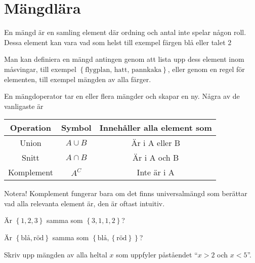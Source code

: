 \section{Mängdlära}

\begin{definition}[Mängd]
En mängd är en samling element där ordning och antal inte spelar någon roll. Dessa element kan vara vad som helst till exempel färgen blå eller talet 2
\end{definition}

Man kan definiera en mängd antingen genom att lista upp dess element inom måsvingar, till exempel \(\left\{\text{flygplan, hatt, pannkaka} \right\}\), eller genom en regel för elementen, till exempel mängden av alla färger.

\begin{definition}[Mängdoperationer]
	En mängdoperator tar en eller flera mängder och skapar en ny. Några av de vanligaste är
	\begin{center}
		\begin{tabular}{|ccc|}
			\hline
			Operation & Symbol & Innehåller alla element som\\ \hline
			Union & \(A\cup B\) & Är i A eller B \\ \hline
			Snitt & \(A \cap  B\) & Är i A och B \\ \hline
			Komplement & \(A^C\) & Inte är i A \\ \hline
		\end{tabular}
	\end{center}
	Notera! Komplement fungerar bara om det finns universalmängd som berättar vad alla relevanta element är, den är oftast intuitiv.
\end{definition}

\begin{problem}
	Är \(\left\{1, 2, 3\right\}\) samma som \(\left\{3, 1, 1, 2\right\}\)?
\end{problem}

\begin{problem}
	Är \(\left\{\text{blå} , \text{röd} \right\}\) samma som \(\left\{\text{blå}, \left\{\text{röd} \right\}\right\}\)?
\end{problem}

\begin{problem}
	Skriv upp mängden av alla heltal \(x\) som uppfyler påståendet ``\(x>2\) och \(x <5\)''.
\end{problem}


